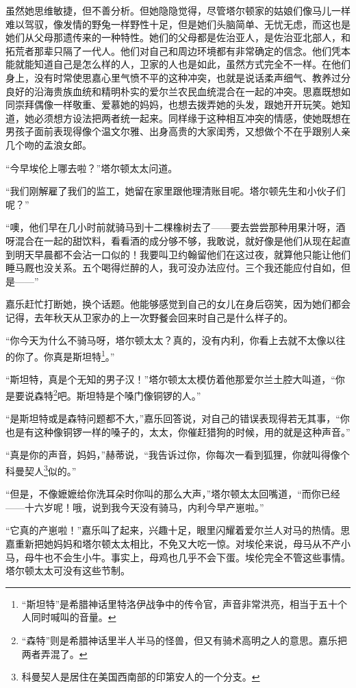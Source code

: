 \par 虽然她思维敏捷，但不善分析。但她隐隐觉得，尽管塔尔顿家的姑娘们像马儿一样难以驾驭，像发情的野兔一样野性十足，但是她们头脑简单、无忧无虑，而这也是她们从父母那遗传来的一种特性。她们的父母都是佐治亚人，是佐治亚北部人，和拓荒者那辈只隔了一代人。他们对自己和周边环境都有非常确定的信念。他们凭本能就能知道自己是怎么样的人，卫家的人也是如此，虽然方式完全不一样。在他们身上，没有时常使思嘉心里气愤不平的这种冲突，也就是说话柔声细气、教养过分良好的沿海贵族血统和精明朴实的爱尔兰农民血统混合在一起的冲突。思嘉既想如同崇拜偶像一样敬重、爱慕她的妈妈，也想去拨弄她的头发，跟她开开玩笑。她知道，她必须想方设法把两者统一起来。同样缘于这种相互冲突的情感，使她既想在男孩子面前表现得像个温文尔雅、出身高贵的大家闺秀，又想做个不在乎跟别人亲几个吻的孟浪女郎。
\par “今早埃伦上哪去啦？”塔尔顿太太问道。
\par “我们刚解雇了我们的监工，她留在家里跟他理清账目呢。塔尔顿先生和小伙子们呢？”
\par “噢，他们早在几小时前就骑马到十二棵橡树去了——要去尝尝那种用果汁呀，酒呀混合在一起的甜饮料，看看酒的成分够不够，我敢说，就好像是他们从现在起直到明天早晨都不会沾一口似的！我要叫卫约翰留他们在这过夜，就算他只能让他们睡马厩也没关系。五个喝得烂醉的人，我可没办法应付。三个我还能应付自如，但是——”
\par 嘉乐赶忙打断她，换个话题。他能够感觉到自己的女儿在身后窃笑，因为她们都会记得，去年秋天从卫家办的上一次野餐会回来时自己是什么样子的。
\par “你今天为什么不骑马呀，塔尔顿太太？真的，没有内利，你看上去就不太像以往的你了。你真是斯坦特\footnote{“斯坦特”是希腊神话里特洛伊战争中的传令官，声音非常洪亮，相当于五十个人同时喊叫的音量。}。”
\par “斯坦特，真是个无知的男子汉！”塔尔顿太太模仿着他那爱尔兰土腔大叫道，“你是要说森特\footnote{“森特”则是希腊神话里半人半马的怪兽，但又有骑术高明之人的意思。嘉乐把两者弄混了。}吧。斯坦特是个嗓门像铜锣的人。”
\par “是斯坦特或是森特问题都不大，”嘉乐回答说，对自己的错误表现得若无其事，“你也是有这种像铜锣一样的嗓子的，太太，你催赶猎狗的时候，用的就是这种声音。”
\par “真是你的声音，妈妈，”赫蒂说，“我告诉过你，你每次一看到狐狸，你就叫得像个科曼契人\footnote{科曼契人是居住在美国西南部的印第安人的一个分支。}似的。”
\par “但是，不像嬷嬷给你洗耳朵时你叫的那么大声，”塔尔顿太太回嘴道，“而你已经——十六岁呢！哦，说到我今天没有骑马，内利今早产崽啦。”
\par “它真的产崽啦！”嘉乐叫了起来，兴趣十足，眼里闪耀着爱尔兰人对马的热情。思嘉重新把她妈妈和塔尔顿太太相比，不免又大吃一惊。对埃伦来说，母马从不产小马，母牛也不会生小牛。事实上，母鸡也几乎不会下蛋。埃伦完全不管这些事情。塔尔顿太太可没有这些节制。

